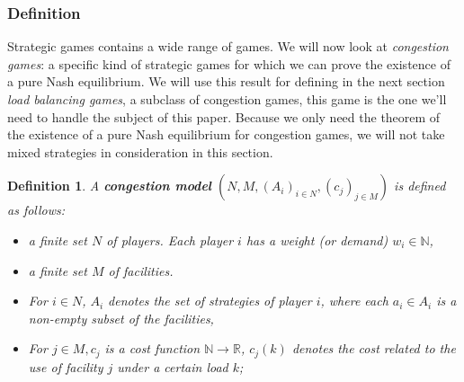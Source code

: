 \documentclass[a4paper,11pt]{article}
\newtheorem{definition}[theorem]{Definition}
\newcommand{\N}{{\mathbb N}}
\newcommand{\R}{{\mathbb R}}
\begin{document}
\subsubsection{Definition}
Strategic games contains a wide range of games. We will now look at \emph{congestion games}: a specific kind of strategic games for which we can prove the existence of a pure Nash equilibrium. We will use this result for defining in the next section \emph{load balancing games}, a subclass of congestion games, this game is the one we'll need to handle the subject of this paper. Because we only need the theorem of the existence of a pure Nash equilibrium for congestion games, we will not take mixed strategies in consideration in this section.
\begin{definition}\cite{4,9}
A \textbf{congestion model} $(N, M, (A_i)_{i\in N}, (c_j)_{j\in M})$ is defined as follows:
\begin{itemize}
  \item a finite set $N$ of players. Each player $i$ has a weight (or demand) $w_i \in \N$,
  \item a finite set $M$ of facilities.
  \item For $i \in N$, $A_i$ denotes the set of strategies of player $i$, where each $a_i \in A_i$ is a non-empty subset of the facilities,
  \item For $j \in M, c_j$  is a cost function $\N \rightarrow \R$, $c_j(k)$ denotes the cost related to the use of facility $j$ under a certain load $k$;
\end{itemize}
\end{definition}
\end{document}
